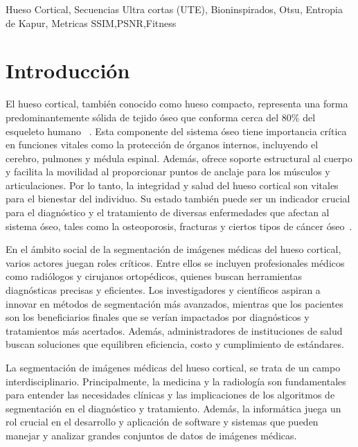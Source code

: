 \documentclass[conference]{IEEEtran}
\begin{document}
\begin{IEEEkeywords}
Hueso Cortical, Secuencias Ultra cortas (UTE), Bioninspirados, Otsu, Entropia de Kapur, Metricas SSIM,PSNR,Fitness
\end{IEEEkeywords}

\section{Introducción}

\noindent El hueso cortical, también conocido como hueso compacto, representa una forma predominantemente sólida de tejido óseo que conforma cerca del 80\% del esqueleto humano ~\cite{nyman2008measurements}. Esta componente del sistema óseo tiene importancia crítica en funciones vitales como la protección de órganos internos, incluyendo el cerebro, pulmones y médula espinal. Además, ofrece soporte estructural al cuerpo y facilita la movilidad al proporcionar puntos de anclaje para los músculos y articulaciones. Por lo tanto, la integridad y salud del hueso cortical son vitales para el bienestar del individuo. Su estado también puede ser un indicador crucial para el diagnóstico y el tratamiento de diversas enfermedades que afectan al sistema óseo, tales como la osteoporosis, fracturas y ciertos tipos de cáncer óseo~\cite{nyman2008measurements}.

\noindent En el ámbito social de la segmentación de imágenes médicas del hueso cortical, varios actores juegan roles críticos. Entre ellos se incluyen profesionales médicos como radiólogos y cirujanos ortopédicos, quienes buscan herramientas diagnósticas precisas y eficientes. Los investigadores y científicos aspiran a innovar en métodos de segmentación más avanzados, mientras que los pacientes son los beneficiarios finales que se verían impactados por diagnósticos y tratamientos más acertados. Además, administradores de instituciones de salud buscan soluciones que equilibren eficiencia, costo y cumplimiento de estándares.

\noindent La segmentación de imágenes médicas del hueso cortical, se trata de un campo interdisciplinario. Principalmente, la medicina y la radiología son fundamentales para entender las necesidades clínicas y las implicaciones de los algoritmos de segmentación en el diagnóstico y tratamiento. Además, la informática juega un rol crucial en el desarrollo y aplicación de software y sistemas que pueden manejar y analizar grandes conjuntos de datos de imágenes médicas.
\end{document}
